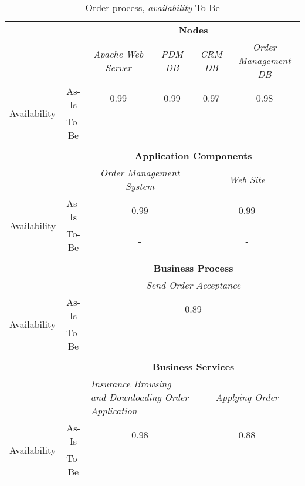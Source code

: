 \begin{table}[H]
	\centering
	\begin{tabular}{|c|c|p{2cm}|p{2.5cm}|p{2.5cm}|p{2.5cm}|}
		\cline{3-6}

		\multicolumn{2}{c}{} & \multicolumn{4}{|c|}{\textbf{Nodes}} \\ \cline{3-6}
		\multicolumn{2}{c|}{} & \multicolumn{1}{c|}{\textsl{Apache Web Server}} & \multicolumn{1}{c|}{\textsl{PDM DB}} & \multicolumn{1}{c|}{\textsl{CRM DB}} & \multicolumn{1}{c|}{\textsl{Order Management DB}}\\
		\hline
		\multirow{2}{*}{Availability} & As-Is & \multicolumn{1}{c|}{0.99} & \multicolumn{1}{c|}{0.99} & \multicolumn{1}{c|}{0.97} & \multicolumn{1}{c|}{0.98}\\ \cline{2-6}
										& To-Be &\multicolumn{1}{c|}{-} & \multicolumn{2}{c|}{-} & \multicolumn{1}{c|}{-}\\ \hline

		\multicolumn{6}{c}{} \\ \cline{3-6}							
		\multicolumn{2}{c}{} & \multicolumn{4}{|c|}{\textbf{Application Components}} \\ \cline{3-6}
		\multicolumn{2}{c|}{} & \multicolumn{2}{c|}{\textsl{Order Management System}} & \multicolumn{2}{c|}{\textsl{Web Site}}\\
		\hline
		\multirow{2}{*}{Availability} & As-Is & \multicolumn{2}{c|}{0.99} & \multicolumn{2}{c|}{0.99}\\ \cline{2-6}
										& To-Be &\multicolumn{2}{c|}{-} & \multicolumn{2}{c|}{-}\\ \hline

		\multicolumn{6}{c}{} \\ \cline{3-6}
		\multicolumn{2}{c}{} & \multicolumn{4}{|c|}{\textbf{Business Process}} \\ \cline{3-6}
		\multicolumn{2}{c|}{} & \multicolumn{4}{|c|}{\textsl{Send Order Acceptance}}\\ \hline
		\multirow{2}{*}{Availability} & As-Is & \multicolumn{4}{|c|}{0.89}\\ \cline{2-6}
									   & To-Be & \multicolumn{4}{|c|}{-}\\ \hline
		\multicolumn{6}{c}{} \\ \cline{3-6}
		\multicolumn{2}{c}{} & \multicolumn{4}{|c|}{\textbf{Business Services}} \\ \cline{3-6}

		\multicolumn{2}{c|}{} & \multicolumn{2}{|p{5cm}|}{\textsl{Insurance Browsing and Downloading Order Application}} & \multicolumn{2}{|c|}{\textsl{Applying Order}} \\ \hline
		\multirow{2}{*}{Availability} & As-Is & \multicolumn{2}{|c|}{0.98} & \multicolumn{2}{|c|}{0.88}\\ \cline{2-6}
									   & To-Be & \multicolumn{2}{|c|}{-} & \multicolumn{2}{|c|}{-}\\ \hline
	\end{tabular}
\caption{Order process, \textsl{availability} To-Be} 
\label{tab:order_to_be}
\end{table}